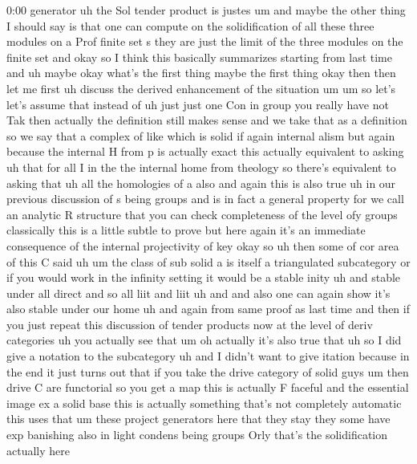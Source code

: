 \begin{unfinished}{0:00}
generator
uh  the  Sol  tender
product  is
justes
um  and  maybe  the  other  thing  I  should
say  is  that  one  can  compute  on  the
solidification  of  all  these  three
modules  on  a  Prof  finite  set  s  they  are
just  the
limit  of  the  three  modules  on  the  finite
set
and  okay  so  I  think  this  basically
summarizes  starting  from  last
time  and
uh
maybe  okay  what's  the  first  thing  maybe
the  first
thing  okay  then  then  let  me  first  uh
discuss  the  derived  enhancement  of  the
situation
um
um  so  let's  let's  assume  that  instead  of
uh
just  just  one  Con  in  group  you  really
have  not
Tak  then  actually  the  definition  still
makes
sense  and  we  take  that  as  a  definition
so  we  say  that  a  complex  of  like  which
is  solid
if
again  internal
alism  but  again  because  the  internal  H
from  p  is  actually  exact  this  actually
equivalent  to  asking
uh  that  for  all  I  in
the  the  internal
home  from
theology  so  there's  equivalent  to  asking
that  uh  all  the  homologies  of  a
also
and  again  this  is  also  true  uh  in  our
previous  discussion  of  s  being  groups
and  is  in  fact  a  general  property  for  we
call  an  analytic  R  structure  that  you
can  check  completeness  of  the  level  ofy
groups  classically  this  is  a  little
subtle  to  prove  but  here  again  it's  an
immediate  consequence  of  the  internal
projectivity  of
key
okay  so
uh  then  some  of  cor  area  of  this  C  said
uh
um  the  class  of  sub  solid  a  is  itself  a
triangulated
subcategory  or  if  you  would  work  in  the
infinity  setting  it  would  be  a
stable  inity
uh
and  stable  under  all
direct  and
so  all  liit  and
liit
uh
and  and  also  one  can  again  show  it's
also
stable  under  our
home  uh  and  again  from  same  proof  as
last  time  and  then  if  you  just  repeat
this  discussion  of  tender  products  now
at  the  level  of  deriv  categories  uh  you
actually  see
that
um  oh  actually  it's  also  true  that  uh
so  I  did  give  a  notation  to  the
subcategory  uh  and  I  didn't  want  to  give
itation  because  in  the  end  it  just  turns
out  that  if  you  take  the  drive  category
of  solid  guys  um  then  drive  C  are
functorial  so  you  get  a
map
this  is  actually  F
faceful  and  the  essential
image  ex  a  solid
base  this  is  actually  something  that's
not  completely  automatic  this  uses  that
um  these  project  generators  here  that
they
stay  they  some  have  exp  banishing  also
in  light  condens  being  groups  Orly
that's  the  solidification  actually  here

\end{unfinished}
